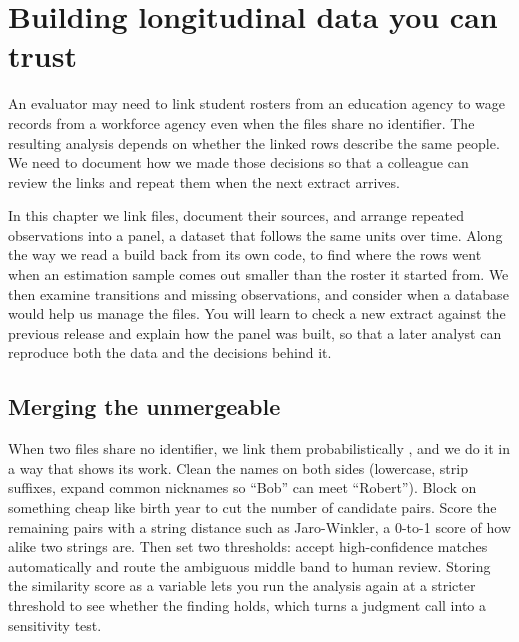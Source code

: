 \chapter{Building longitudinal data you can trust}\label{ch:panels}

An evaluator may need to link student rosters from an education agency to wage records from a workforce agency even when the files share no identifier. The resulting analysis depends on whether the linked rows describe the same people. We need to document how we made those decisions so that a colleague can review the links and repeat them when the next extract arrives.

In this chapter we link files, document their sources, and arrange repeated observations into a panel, a dataset that follows the same units over time. Along the way we read a build back from its own code, to find where the rows went when an estimation sample comes out smaller than the roster it started from. We then examine transitions and missing observations, and consider when a database would help us manage the files. You will learn to check a new extract against the previous release and explain how the panel was built, so that a later analyst can reproduce both the data and the decisions behind it.

\section{Merging the unmergeable}
When two files share no identifier, we link them probabilistically \parencite{fellegi1969linkage}, and we do it in a way that shows its work. Clean the names on both sides (lowercase, strip suffixes, expand common nicknames so \enquote{Bob} can meet \enquote{Robert}). Block on something cheap like birth year to cut the number of candidate pairs. Score the remaining pairs with a string distance such as Jaro-Winkler, a 0-to-1 score of how alike two strings are. Then set two thresholds: accept high-confidence matches automatically and route the ambiguous middle band to human review. Storing the similarity score as a variable lets you run the analysis again at a stricter threshold to see whether the finding holds, which turns a judgment call into a sensitivity test.

